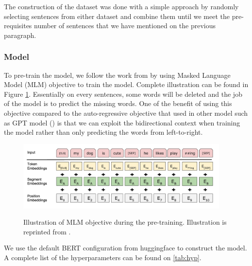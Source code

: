 The construction of the dataset was done with a simple approach by randomly selecting sentences from either dataset and combine them until we meet the pre-requisites number of sentences that we have mentioned on the previous paragraph.

\subsubsection{Model}
To pre-train the model, we follow the work from \cite{devlin2018bert} by using Masked Language Model (MLM) objective to train the model. Complete illustration can be found in Figure \ref{img:mlmobj}. Essentially on every sentences, some words will be deleted and the job of the model is to predict the missing words. One of the benefit of using this objective compared to the auto-regressive objective that used in other model such as GPT model (\cite{brown2020language,ratford2019language,radford2018improving}) is that we can exploit the bidirectional context when training the model rather than only predicting the words from left-to-right.

\begin{figure}[h]
    {\includegraphics[width=0.95\textwidth]{img/mlm_obj.png}}
    \centering
    \caption{Illustration of MLM objective during the pre-training. Illustration is reprinted from \cite{devlin2018bert}.}
    \label{img:mlmobj}
\end{figure}

We use the default BERT configuration from huggingface to construct the model. A complete list of the hyperparameters can be found on \cref{tab:hyp}.

